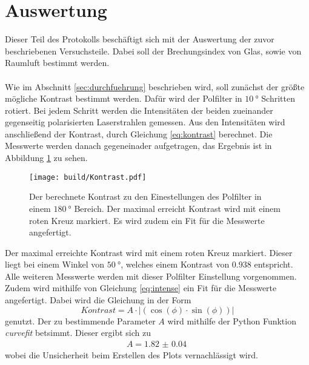 \newpage
\section{Auswertung}
\label{sec:auswertung}

Dieser Teil des Protokolls beschäftigt sich mit der Auswertung der zuvor beschriebenen Versuchsteile.
Dabei soll der Brechungsindex von Glas, sowie von Raumluft bestimmt werden.\\\\
Wie im Abschnitt \ref{sec:durchfuehrung} beschrieben wird, soll zunächst der größte mögliche Kontrast bestimmt werden.
Dafür wird der Polfilter in $\SI{10}{\degree}$ Schritten rotiert.
Bei jedem Schritt werden die Intensitäten der beiden zueinander gegenseitig polarisierten Laserstrahlen gemessen.
Aus den Intensitäten wird anschließend der Kontrast, durch Gleichung \eqref{eq:kontrast} berechnet.
Die Messwerte werden danach gegeneinader aufgetragen, das Ergebnis ist in Abbildung \ref{fig:Kontrast} zu sehen.
\begin{figure}
    \centering
    \texttt{[image: build/Kontrast.pdf]}
    \caption{Der berechnete Kontrast zu den Einestellungen des Polfilter in einem $\SI{180}{\degree}$ Bereich.
    Der maximal erreicht Kontrast wird mit einem roten Kreuz markiert.
    Es wird zudem ein Fit für die Messwerte angefertigt.}
    \label{fig:Kontrast}
\end{figure}
Der maximal erreichte Kontrast wird mit einem roten Kreuz markiert.
Dieser liegt bei einem Winkel von $\SI{50}{\degree}$, welches einem Kontrast von $0.938$ entspricht.
Alle weiteren Messwerte werden mit dieser Polfilter Einstellung vorgenommen.
Zudem wird mithilfe von Gleichung \eqref{eq:intense} ein Fit für die Messwerte angefertigt.
Dabei wird die Gleichung in der Form 
\begin{equation*}
    Kontrast =  A\cdot |(\cos(\phi)\cdot \sin(\phi))|
\end{equation*}
genutzt.
Der zu bestimmende Parameter $A$ wird mithilfe der Python Funktion \textit{curvefit} \cite{scipy} betsimmt.
Dieser ergibt sich zu 
\begin{align*}
    A = \SI{1.82(4)}{}
\end{align*}
wobei die Unsicherheit beim Erstellen des Plots vernachlässigt wird.
